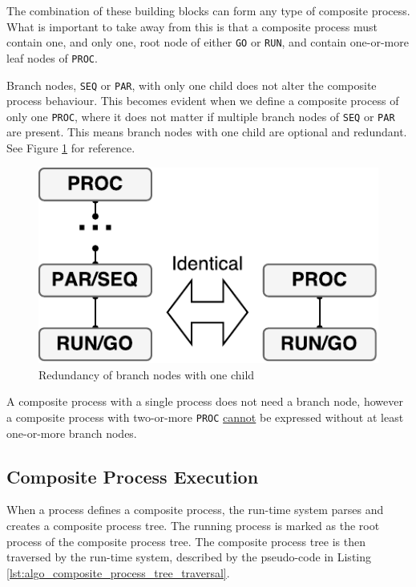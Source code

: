 \FloatBarrier

The combination of these building blocks can form any type of composite process. What is important to take away from this is that a composite process must \underline{} contain one, and only one, root node of either \texttt{GO} or \texttt{RUN}, and \underline{} contain one\hyp{}or\hyp{}more leaf nodes of \texttt{PROC}. 

Branch nodes, \texttt{SEQ} or \texttt{PAR}, with only one child does not alter the composite process behaviour. This becomes evident when we define a composite process of only one \texttt{PROC}, where it does not matter if multiple branch nodes of \texttt{SEQ} or \texttt{PAR} are present. This means branch nodes with one child are optional and redundant. See Figure \ref{fig:composite_axiom} for reference. 

\FloatBarrier

\begin{figure}[h]
    \centering
    \includegraphics[width=0.5\linewidth]{fig/composite_axiom}
    \caption{Redundancy of branch nodes with one child}
    \label{fig:composite_axiom}
\end{figure}

\FloatBarrier

A composite process with a single process does not need a branch node, however a composite process with two\hyp{}or\hyp{}more \texttt{PROC} \underline{cannot} be expressed without at least one\hyp{}or\hyp{}more branch nodes.


\subsection{Composite Process Execution}

When a process defines a composite process, the run\hyp{}time system parses and creates a composite process tree. The running process is marked as the root process of the composite process tree. The composite process tree is then traversed by the run\hyp{}time system, described by the pseudo\hyp{}code in Listing \ref{lst:algo_composite_process_tree_traversal}.

